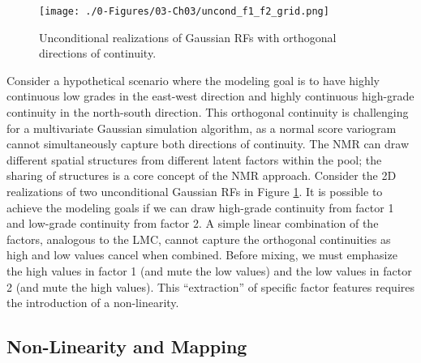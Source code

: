 \begin{figure}[htb!]
    \centering
    \texttt{[image: ./0-Figures/03-Ch03/uncond\_f1\_f2\_grid.png]}
    \caption{Unconditional realizations of Gaussian \glspl{RF} with orthogonal directions of continuity.}
    \label{fig:uncond_f1_f2_grid}
\end{figure}

Consider a hypothetical scenario where the modeling goal is to have highly continuous low grades in the east-west direction and highly continuous high-grade continuity in the north-south direction. This orthogonal continuity is challenging for a multivariate Gaussian simulation algorithm, as a normal score variogram cannot simultaneously capture both directions of continuity. The \gls{NMR} can draw different spatial structures from different latent factors within the pool; the sharing of structures is a core concept of the \gls{NMR} approach. Consider the \gls{2D} realizations of two unconditional Gaussian \glspl{RF} in Figure \ref{fig:uncond_f1_f2_grid}. It is possible to achieve the modeling goals if we can draw high-grade continuity from factor 1 and low-grade continuity from factor 2. A simple linear combination of the factors, analogous to the \gls{LMC}, cannot capture the orthogonal continuities as high and low values cancel when combined. Before mixing, we must emphasize the high values in factor 1 (and mute the low values) and the low values in factor 2 (and mute the high values). This ``extraction'' of specific factor features requires the introduction of a non-linearity.

\subsection{Non-Linearity and Mapping}
\label{subsec:03nonlinear}

